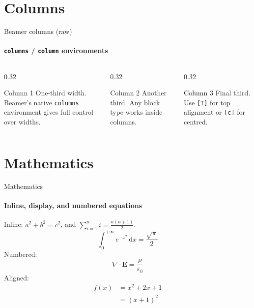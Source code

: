 \documentclass[sans,numeric,titlesplit]{qslides}
\begin{document}
\section{Columns}

\begin{frame}{Beamer columns (raw)}
  \framesubtitle{\texttt{columns} / \texttt{column} environments}
  \begin{columns}[T]
    \begin{column}{0.32\textwidth}
      \begin{block}{Column 1}
        One-third width. Beamer's native \texttt{columns} environment
        gives full control over widths.
      \end{block}
    \end{column}
    \begin{column}{0.32\textwidth}
      \begin{exampleblock}{Column 2}
        Another third.  Any block type works inside columns.
      \end{exampleblock}
    \end{column}
    \begin{column}{0.32\textwidth}
      \begin{alertblock}{Column 3}
        Final third. Use \texttt{[T]} for top alignment or
        \texttt{[c]} for centred.
      \end{alertblock}
    \end{column}
  \end{columns}
\end{frame}

\section{Mathematics}

\begin{frame}{Mathematics}
  \framesubtitle{Inline, display, and numbered equations}
  Inline: $a^2 + b^2 = c^2$, and $\sum_{i=1}^n i = \frac{n(n+1)}{2}$.
  \begin{displaymath}
    \int_0^{+\infty} e^{-x^2}\,\mathrm{d}x = \frac{\sqrt{\pi}}{2}
  \end{displaymath}
  Numbered:
  \begin{equation}
    \nabla \cdot \mathbf{E} = \frac{\rho}{\varepsilon_0}
  \end{equation}
  Aligned:
  \begin{align}
    f(x) &= x^2 + 2x + 1 \\
    &= (x+1)^2
  \end{align}
\end{frame}
\end{document}
